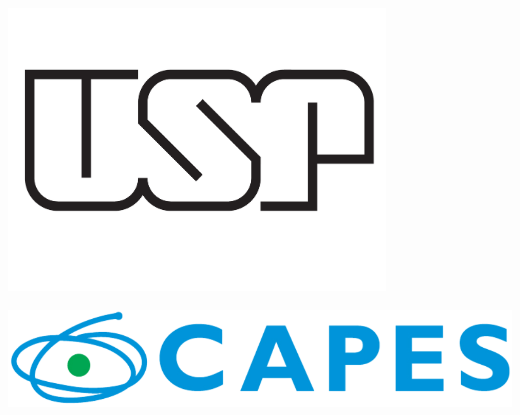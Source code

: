 \documentclass[a0,portrait]{a0poster}
\begin{document}
\begin{multicols}{2}
\begin{minipage}[b]{0.3\linewidth}
\includegraphics[width=10cm]{usplogo.pdf}\\
\end{minipage}


%
\hfill
\begin{minipage}[b]{0.7\linewidth}
    \vspace{1.7cm}
\includegraphics[width=20cm]{logohorizontalcapes2.png}\\
\end{minipage}

\end{multicols}
\end{document}
